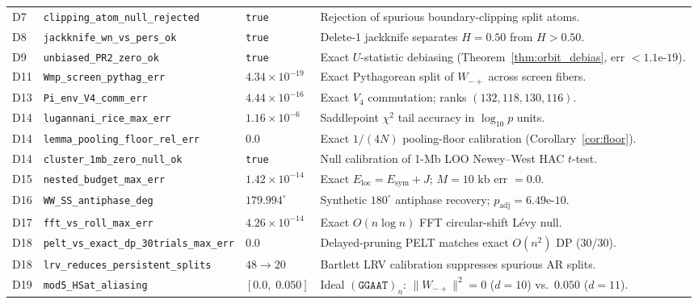 \documentclass[11pt,a4paper]{article}
\newcommand{\Wmp}{W_{-+}}
\begin{document}
\begin{table}[htbp]
\begin{tabularx}{\textwidth}{@{}lllX@{}}
D7 & \texttt{clipping\_atom\_null\_rejected} & \texttt{true} & Rejection of spurious boundary-clipping split atoms. \\
D8 & \texttt{jackknife\_wn\_vs\_pers\_ok} & \texttt{true} & Delete-1 jackknife separates $H=0.50$ from $H>0.50$. \\
D9 & \texttt{unbiased\_PR2\_zero\_ok} & \texttt{true} & Exact $U$-statistic debiasing (Theorem~\ref{thm:orbit_debias}, err $<1.1\text{e-}19$). \\
D11 & \texttt{Wmp\_screen\_pythag\_err} & $4.34\times 10^{-19}$ & Exact Pythagorean split of $\Wmp$ across screen fibers. \\
D13 & \texttt{Pi\_env\_V4\_comm\_err} & $4.44\times 10^{-16}$ & Exact $V_4$ commutation; ranks $(132,118,130,116)$. \\
D14 & \texttt{lugannani\_rice\_max\_err} & $1.16\times 10^{-6}$ & Saddlepoint $\chi^2$ tail accuracy in $\log_{10} p$ units. \\
D14 & \texttt{lemma\_pooling\_floor\_rel\_err} & $0.0$ & Exact $1/(4N)$ pooling-floor calibration (Corollary~\ref{cor:floor}). \\
D14 & \texttt{cluster\_1mb\_zero\_null\_ok} & \texttt{true} & Null calibration of 1-Mb LOO Newey--West HAC $t$-test. \\
D15 & \texttt{nested\_budget\_max\_err} & $1.42\times 10^{-14}$ & Exact $E_{\mathrm{loc}}=E_{\mathrm{sym}}+J$; $M=10\text{ kb}$ err $=0.0$. \\
D16 & \texttt{WW\_SS\_antiphase\_deg} & $179.994^\circ$ & Synthetic $180^\circ$ antiphase recovery; $p_{\mathrm{adj}}=6.49\text{e-}10$. \\
D17 & \texttt{fft\_vs\_roll\_max\_err} & $4.26\times 10^{-14}$ & Exact $O(n\log n)$ FFT circular-shift L\'evy null. \\
D18 & \texttt{pelt\_vs\_exact\_dp\_30trials\_max\_err} & $0.0$ & Delayed-pruning PELT matches exact $O(n^2)$ DP (30/30). \\
D18 & \texttt{lrv\_reduces\_persistent\_splits} & $48 \to 20$ & Bartlett LRV calibration suppresses spurious AR splits. \\
D19 & \texttt{mod5\_HSat\_aliasing} & $[0.0,\;0.050]$ & Ideal $(\texttt{GGAAT})_n$: $\|\Wmp\|^2=0$ ($d=10$) vs.\ $0.050$ ($d=11$). \\
\bottomrule
\end{tabularx}
\end{table}
\end{document}
